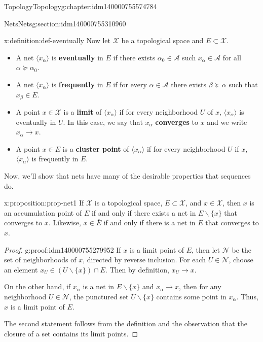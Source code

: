 \documentclass[oneside,10pt,]{book}
\newcommand{\terminology}[1]{\textbf{#1}}
\numberwithin{equation}{section}
\newcommand{\N}{\mathcal{N}}
\newcommand{\cc}[1]{\overline{#1}}
\newcommand\net[1]{\langle #1 \rangle}
\numberwithin{equation}{section}
\begin{document}
\begin{chapterptx}{Topology}{}{Topology}{}{}{g:chapter:idm140000755574784}
\begin{sectionptx}{Nets}{}{Nets}{}{}{g:section:idm140000755310960}
\begin{definition}{}{x:definition:def-eventually}%
Now let \(\mathcal{X}\) be a topological space and \(E \subset \mathcal{X}\).%
\begin{itemize}[label=\textbullet]
\item{}A net \(\net{x_\alpha}\) is \terminology{eventually} in \(E\) if there exists \(\alpha_0 \in \mathcal{A}\) such \(x_\alpha \in \mathcal{A}\) for all \(\alpha \succeq \alpha_0\).%
\item{}A net \(\net{x_\alpha}\) is \terminology{frequently} in \(E\) if for every \(\alpha \in \mathcal{A}\) there exists \(\beta \succeq \alpha\) such that \(x_\beta \in E\).%
\item{}A point \(x \in \mathcal{X}\) is a \terminology{limit} of \(\net{x_\alpha}\) if for every neighborhood \(U\) of \(x\), \(\net{x_\alpha}\) is eventually in \(U\). In this case, we say that \(x_\alpha\) \terminology{converges} to \(x\) and we write \(x_\alpha \to x\).%
\item{}A point \(x \in E\) is a \terminology{cluster point} of \(\net{x_\alpha}\) if for every neighborhood \(U\) if \(x\), \(\net{x_\alpha}\) is frequently in \(E\).%
\end{itemize}
%
\end{definition}
Now, we'll show that nets have many of the desirable properties that sequences do.%
\begin{proposition}{}{}{x:proposition:prop-net1}%
If \(\mathcal X\) is a topological space, \(E \subset \mathcal{X}\), and \(x \in \mathcal X\), then \(x\) is an accumulation point of \(E\) if and only if there exists a net in \(E\backslash\{x\}\) that converges to \(x\). Likewise, \(x \in \cc{E}\) if and only if there is a net in \(E\) that converges to \(x\).%
\end{proposition}
\begin{proof}{}{g:proof:idm140000755279952}
If \(x\) is a limit point of \(E\), then let \(\N\) be the set of neighborhoods of \(x\), directed by reverse inclusion. For each \(U \in \N\), choose an element \(x_U \in (U\backslash\{x\})\cap E\). Then by definition, \(x_U \to x\).%
\par
On the other hand, if \(x_\alpha\) is a net in \(E\backslash\{x\}\) and \(x_\alpha \to x\), then for any neighborhood \(U \in \N\), the punctured set \(U\backslash\{x\}\) contains some point in \(x_\alpha\). Thus, \(x\) is a limit point of \(E\).%
\par
The second statement follows from the definition and the observation that the closure of a set contains its limit points.%

\end{proof}
\end{sectionptx}
\end{chapterptx}
\end{document}
